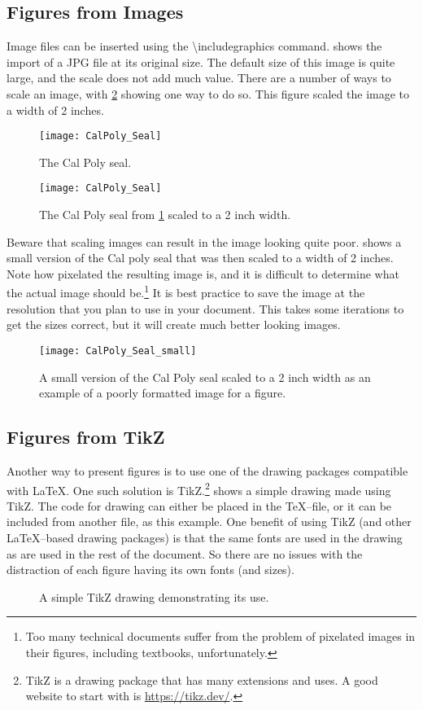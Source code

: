 \subsection{Figures from Images} \label{sec:FiguresFromImages}
Image files can be inserted using the \textbackslash includegraphics command.
 shows the import of a JPG file at its original size.
The default size of this image is quite large, and the scale does not add much value.
There are a number of ways to scale an image, with \cref{fig:CalPolySeal_small} showing one way to do so.
This figure scaled the image to a width of 2 inches.
\begin{figure}
	\centering
	\texttt{[image: CalPoly\_Seal]}
	\caption{The Cal Poly seal.}
	\label{fig:CalPolySeal1}
\end{figure}
\begin{figure}
	\centering
	\texttt{[image: CalPoly\_Seal]}
	\caption{The Cal Poly seal from \cref{fig:CalPolySeal1} scaled to a 2 inch width.}
	\label{fig:CalPolySeal_small}
\end{figure}

Beware that scaling images can result in the image looking quite poor.
 shows a small version of the Cal poly seal that was then scaled to a width of 2 inches.
Note how pixelated the resulting image is, and it is difficult to determine what the actual image should be.\footnote{Too many technical documents suffer from the problem of pixelated images in their figures, including textbooks, unfortunately.}
It is best practice to save the image at the resolution that you plan to use in your document.
This takes some iterations to get the sizes correct, but it will create much better looking images.
\begin{figure}
	\centering
	\texttt{[image: CalPoly\_Seal\_small]}
	\caption{A small version of the Cal Poly seal scaled to a 2 inch width as an example of a poorly formatted image for a figure.}
	\label{fig:CalPolySeal_scaled}
\end{figure}

\subsection{Figures from TikZ} \label{sec:FiguresFromTikZ}
Another way to present figures is to use one of the drawing packages compatible with \LaTeX.
One such solution is TikZ.\footnote{TikZ is a drawing package that has many extensions and uses. A good website to start with is \url{https://tikz.dev/}.}
 shows a simple drawing made using TikZ.
The code for drawing can either be placed in the \TeX--file, or it can be included from another file, as this example.
One benefit of using TikZ (and other \LaTeX--based drawing packages) is that the same fonts are used in the drawing as are used in the rest of the document.
So there are no issues with the distraction of each figure having its own fonts (and sizes).
\begin{figure}
	\centering
	
	\caption{A simple TikZ drawing demonstrating its use.}
	\label{fig:tikz_drawing}
\end{figure}

